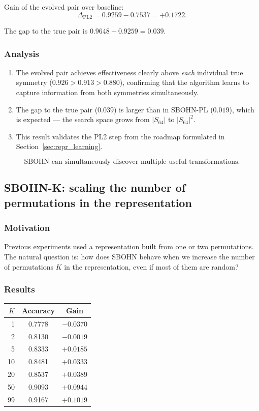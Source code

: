 \documentclass[11pt,a4paper]{report}
\begin{document}
Gain of the evolved pair over baseline:
\[
\Delta_{\text{PL2}} = 0.9259 - 0.7537 = +0.1722.
\]

The gap to the true pair is $0.9648-0.9259=0.039$.

\subsubsection{Analysis}

\begin{enumerate}
\item The evolved pair achieves effectiveness clearly above \emph{each} individual true symmetry ($0.926 > 0.913 > 0.880$), confirming that the algorithm learns to capture information from both symmetries simultaneously.
\item The gap to the true pair ($0.039$) is larger than in SBOHN-PL ($0.019$), which is expected --- the search space grows from $|S_{64}|$ to $|S_{64}|^2$.
\item This result validates the PL2 step from the roadmap formulated in Section~\ref{sec:repr_learning}.
\end{enumerate}

\[
\boxed{\text{SBOHN can simultaneously discover multiple useful transformations.}}
\]

\subsection{SBOHN-K: scaling the number of permutations in the representation}

\subsubsection{Motivation}

Previous experiments used a representation built from one or two permutations. The natural question is: how does SBOHN behave when we increase the number of permutations $K$ in the representation, even if most of them are random?

\subsubsection{Results}

\begin{center}
\begin{tabular}{rcc}
\toprule
$K$ & Accuracy & Gain \\
\midrule
1 & 0.7778 & $-0.0370$ \\
2 & 0.8130 & $-0.0019$ \\
5 & 0.8333 & $+0.0185$ \\
10 & 0.8481 & $+0.0333$ \\
20 & 0.8537 & $+0.0389$ \\
50 & 0.9093 & $+0.0944$ \\
99 & 0.9167 & $+0.1019$ \\
\bottomrule
\end{tabular}
\end{center}
\end{document}
